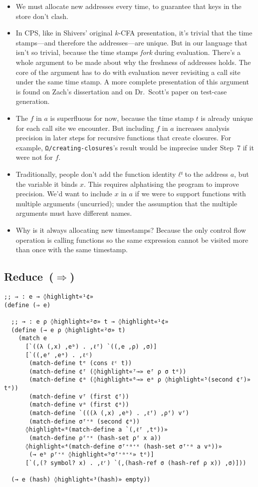 \documentclass[12pt, oneside]{book}
\begin{document}
\begin{itemize}
  \item We must allocate new addresses every time, to guarantee that keys in the store don’t clash.
  \item In CPS, like in Shivers’ original \(k\)-CFA presentation, it’s trivial that the time stamps—and therefore the addresses—are unique. But in our language that isn’t so trivial, because the time stamps \emph{fork} during evaluation. There’s a whole argument to be made about why the freshness of addresses holds. The core of the argument has to do with evaluation never revisiting a call site under the same time stamp. A more complete presentation of this argument is found on Zach’s dissertation and on Dr.~Scott’s paper on test-case generation.
  \item The \(f\) in \(a\) is superfluous for now, because the time stamp \(t\) is already unique for each call site we encounter. But including \(f\) in \(a\) increases analysis precision in later steps for recursive functions that create closures. For example, \texttt{Ω/creating-closures}’s result would be imprecise under Step~7 if it were not for \(f\).
  \item Traditionally, people don’t add the function identity \(ℓᶠ\) to the address \(a\), but the variable it binds \(x\). This requires alphatising the program to improve precision. We’d want to include \(x\) in \(a\) if we were to support functions with multiple arguments (uncurried); under the assumption that the multiple arguments must have different names.
  \item Why is it always allocating new timestamps? Because the only control flow operation is calling functions so the same expression cannot be visited more than once with the same timestamp.
\end{itemize}

\subsection{Reduce~(\(⇒\))}

\begin{Verbatim}
;; ⇒ : e → ◊highlight«¹¢»
(define (⇒ e)

  ;; → : e ρ ◊highlight«²σ» t → ◊highlight«¹¢»
  (define (→ e ρ ◊highlight«²σ» t)
    (match e
      [`((λ (,x) ,eᵇ) . ,ℓᶠ) `((,e ,ρ) ,σ)]
      [`((,eᶠ ,eᵃ) . ,ℓᶜ)
       (match-define tᵉ (cons ℓᶜ t))
       (match-define ¢ᶠ (◊highlight«⁷→» eᶠ ρ σ tᵉ))
       (match-define ¢ᵃ (◊highlight«⁶→» eᵃ ρ ◊highlight«⁵(second ¢ᶠ)» tᵉ))
       (match-define vᶠ (first ¢ᶠ))
       (match-define vᵃ (first ¢ᵃ))
       (match-define `(((λ (,x) ,eᵇ) . ,ℓᶠ) ,ρᶠ) vᶠ)
       (match-define σᶠ⁺ᵃ (second ¢ᵃ))
      ◊highlight«⁸(match-define a `(,ℓᶠ ,tᵉ))»
       (match-define ρᶠ⁺ˣ (hash-set ρᶠ x a))
      ◊highlight«⁴(match-define σᶠ⁺ᵃ⁺ˣ (hash-set σᶠ⁺ᵃ a vᵃ))»
       (→ eᵇ ρᶠ⁺ˣ ◊highlight«⁹σᶠ⁺ᵃ⁺ˣ» tᵉ)]
      [`(,(? symbol? x) . ,ℓʳ) `(,(hash-ref σ (hash-ref ρ x)) ,σ)]))

  (→ e (hash) ◊highlight«³(hash)» empty))
\end{Verbatim}
\end{document}
